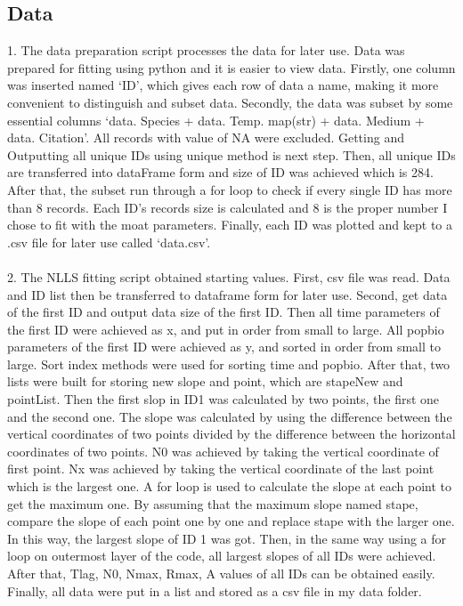 \documentclass[11pt]{article}
\begin{document}
    \subsection{Data}
    1. The data preparation script processes the data for later use. Data was prepared for fitting using python and it is easier to view data. Firstly, one column was inserted named ‘ID’, which gives each row of data a name, making it more convenient to distinguish and subset data.  Secondly, the data was subset by some essential columns ‘data. Species + data. Temp. map(str) + data. Medium + data. Citation’.  All records with value of NA were excluded. Getting and Outputting all unique IDs using unique method is next step. Then, all unique IDs are transferred into dataFrame form and size of ID was achieved which is 284. After that, the subset run through a for loop to check if every single ID has more than 8 records. Each ID’s records size is calculated and 8 is the proper number I chose to fit with the moat parameters.  Finally, each ID was plotted and kept to a .csv file for later use called ‘data.csv’.  
    \\\\2. The NLLS fitting script obtained starting values. First, csv file was read. Data and ID list then be transferred to dataframe form for later use. Second, get data of the first ID and output data size of the first ID.  Then all time parameters of the first ID were achieved as x, and put in order from small to large.  All popbio parameters of the first ID were achieved as y, and sorted in order from small to large. Sort index methods were used for sorting time and popbio.  After that, two lists were built for storing new slope and point, which are stapeNew and pointList.  Then the first slop in ID1 was calculated by two points, the first one and the second one. The slope was calculated by using the difference between the vertical coordinates of two points divided by the difference between the horizontal coordinates of two points. N0 was achieved by taking the vertical coordinate of first point. Nx was achieved by taking the vertical coordinate of the last point which is the largest one.  A for loop is used to calculate the slope at each point to get the maximum one. By assuming that the maximum slope named stape, compare the slope of each point one by one and replace stape with the larger one. In this way, the largest slope of ID 1 was got.  Then, in the same way using a for loop on outermost layer of the code, all largest slopes of all IDs were achieved. After that, Tlag, N0, Nmax, Rmax, A values of all IDs can be obtained easily. Finally, all data were put in a list and stored as a csv file in my data folder.
  
\end{document}
